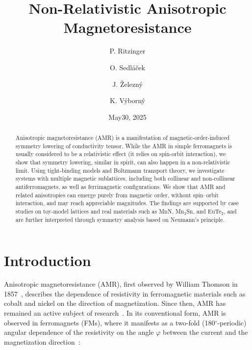 \documentclass[prb,showpacs,amsmath,amssymb,superscriptaddress,twocolumn,floatfix]{revtex4-1}
\begin{document}
\title{Non-Relativistic Anisotropic Magnetoresistance}

\author{P. Ritzinger}

\author{O. Sedl\'a\v cek}
\author{J. \v Zelezn\'y}

\author{K. V\'yborn\'y}


\date{May30, 2025}

\begin{abstract}
Anisotropic magnetoresistance (AMR) is a manifestation of
magnetic-order-induced symmetry lowering of conductivity tensor. While the AMR in simple ferromagnets is usually considered to be a relativistic effect (it relies on spin-orbit interaction), we show that symmetry lowering, similar in spirit, can also happen in a non-relativistic limit. Using tight-binding models and Boltzmann transport theory, we investigate systems with multiple magnetic sublattices, including both collinear and non-collinear antiferromagnets, as well as ferrimagnetic configurations. We show that AMR and related anisotropies can emerge purely from magnetic order, without spin–orbit interaction, and may reach appreciable magnitudes. The findings are supported by case studies on toy-model lattices and real materials such as MnN, Mn$_3$Sn, and EuTe$_2$, and are further interpreted through symmetry analysis based on Neumann’s principle.
\end{abstract}


\maketitle


\section{Introduction}

Anisotropic magnetoresistance (AMR), first observed by William Thomson in 1857~\cite{Thomson:1857}, describes the dependence of resistivity in ferromagnetic materials such as cobalt and nickel on the direction of magnetization. Since then, AMR has remained an active subject of research~\cite{Ritzinger:2023}. In its conventional form, AMR is observed in ferromagnets (FMs), where it manifests as a two-fold (180$^\circ$-periodic) angular dependence of the resistivity on the angle $\varphi$ between the current and the magnetization direction~\cite{Alagoz:2015}:
\end{document}
